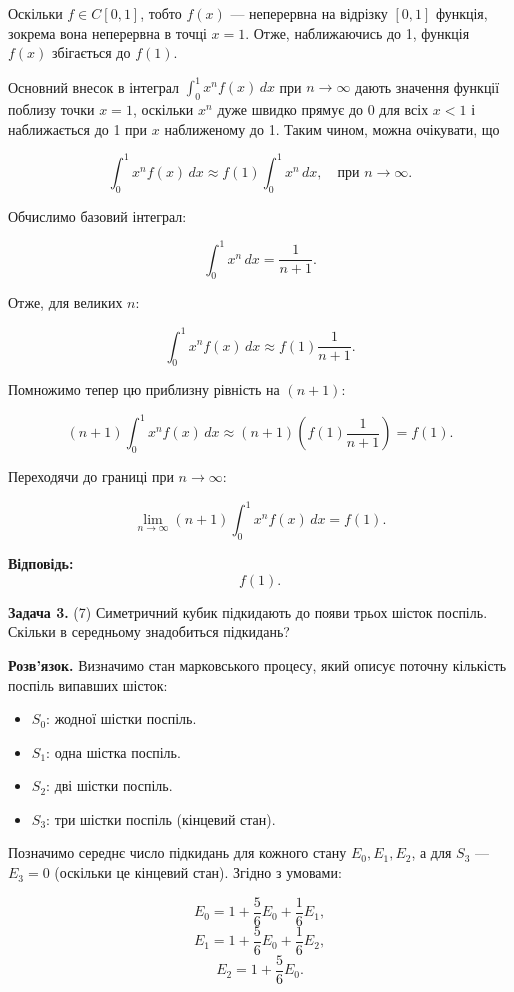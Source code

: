 \documentclass{article}
\begin{document}
Оскільки \( f \in C[0, 1] \), тобто \( f(x) \) — неперервна на відрізку \([0,1]\) функція, зокрема вона неперервна в точці \( x = 1 \). Отже, наближаючись до 1, функція \( f(x) \) збігається до \( f(1) \).

Основний внесок в інтеграл \(\int_0^1 x^n f(x) \, dx\) при \( n \to \infty \) дають значення функції поблизу точки \( x = 1 \), оскільки \( x^n \) дуже швидко прямує до 0 для всіх \( x < 1 \) і наближається до 1 при \( x \) наближеному до 1. Таким чином, можна очікувати, що

\[
\int_0^1 x^n f(x)\,dx \approx f(1) \int_0^1 x^n \, dx, \quad \text{при } n \to \infty.
\]

Обчислимо базовий інтеграл:

\[
\int_0^1 x^n \, dx = \frac{1}{n+1}.
\]

Отже, для великих \( n \):

\[
\int_0^1 x^n f(x)\,dx \approx f(1)\frac{1}{n+1}.
\]

Помножимо тепер цю приблизну рівність на \( (n+1) \):

\[
(n+1) \int_0^1 x^n f(x)\,dx \approx (n+1) \left( f(1)\frac{1}{n+1} \right) = f(1).
\]

Переходячи до границі при \( n \to \infty \):

\[
\lim_{n \to \infty} (n + 1) \int_0^1 x^n f(x)\,dx = f(1).
\]

\textbf{Відповідь:}  
\[
\boxed{f(1)}.
\]

\bigskip

\noindent\textbf{Задача 3.} (7) Симетричний кубик підкидають до появи трьох шісток поспіль. Скільки в середньому знадобиться підкидань?

\textbf{Розв’язок.} Визначимо стан марковського процесу, який описує поточну кількість поспіль випавших шісток:
\begin{itemize}
    \item \( S_0 \): жодної шістки поспіль.
    \item \( S_1 \): одна шістка поспіль.
    \item \( S_2 \): дві шістки поспіль.
    \item \( S_3 \): три шістки поспіль (кінцевий стан).
\end{itemize}

Позначимо середнє число підкидань для кожного стану \( E_0, E_1, E_2 \), а для \( S_3 \) — \( E_3 = 0 \) (оскільки це кінцевий стан). Згідно з умовами:

\[
E_0 = 1 + \frac{5}{6}E_0 + \frac{1}{6}E_1,
\]
\[
E_1 = 1 + \frac{5}{6}E_0 + \frac{1}{6}E_2,
\]
\[
E_2 = 1 + \frac{5}{6}E_0.
\]
\end{document}
